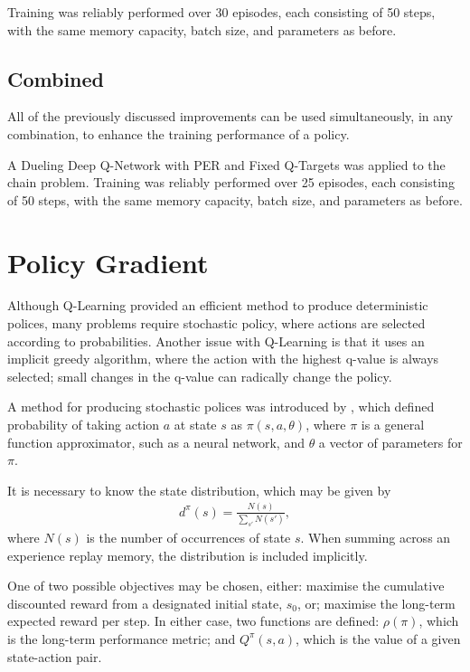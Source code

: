 Training was reliably performed over 30 episodes, each consisting of 50 steps,
with the same memory capacity, batch size, and parameters as before.



\subsection{Combined}

All of the previously discussed improvements can be used simultaneously, in any
combination, to enhance the training performance of a policy.

A Dueling Deep Q-Network with PER and Fixed Q-Targets was applied to the chain
problem.
Training was reliably performed over 25 episodes, each consisting of 50 steps,
with the same memory capacity, batch size, and parameters as before.



\section{Policy Gradient}

Although Q-Learning provided an efficient method to produce deterministic
polices, many problems require stochastic policy, where actions are selected
according to probabilities.
Another issue with Q-Learning is that it uses an implicit greedy algorithm,
where the action with the highest q-value is always selected; small changes in
the q-value can radically change the policy.

A method for producing stochastic polices was introduced by
\cite{Sutton:2000:Policy}, which defined probability of taking action $a$ at
state $s$ as $\pi(s,a,\theta)$, where $\pi$ is a general function approximator,
such as a neural network, and $\theta$ a vector of parameters for $\pi$.

It is necessary to know the state distribution, which may be given by
\begin{align*}
    d^\pi(s) = \frac{N(s)}{\sum_{s'} N(s')},
\end{align*}
where $N(s)$ is the number of occurrences of state $s$.
When summing across an experience replay memory, the distribution is included
implicitly.

One of two possible objectives may be chosen, either:
maximise the cumulative discounted reward from a designated initial state,
$s_0$, or;
maximise the long-term expected reward per step.
In either case, two functions are defined:
$\rho(\pi)$, which is the long-term performance metric;
and $Q^\pi(s,a)$, which is the value of a given state-action pair.

